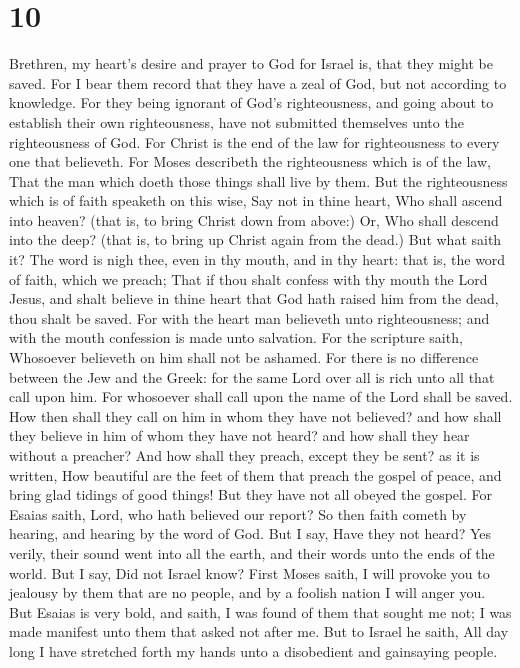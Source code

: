 \hypertarget{section-9}{%
\section{10}\label{section-9}}

 Brethren, my heart's desire and prayer to God for Israel
is, that they might be saved.  For I bear them record that
they have a zeal of God, but not according to knowledge. 
For they being ignorant of God's righteousness, and going about to
establish their own righteousness, have not submitted themselves unto
the righteousness of God.  For Christ is the end of the law
for righteousness to every one that believeth.  For Moses
describeth the righteousness which is of the law, That the man which
doeth those things shall live by them.  But the
righteousness which is of faith speaketh on this wise, Say not in thine
heart, Who shall ascend into heaven? (that is, to bring Christ down from
above:)  Or, Who shall descend into the deep? (that is, to
bring up Christ again from the dead.)  But what saith it?
The word is nigh thee, even in thy mouth, and in thy heart: that is, the
word of faith, which we preach;  That if thou shalt confess
with thy mouth the Lord Jesus, and shalt believe in thine heart that God
hath raised him from the dead, thou shalt be saved.  For
with the heart man believeth unto righteousness; and with the mouth
confession is made unto salvation.  For the scripture
saith, Whosoever believeth on him shall not be ashamed. 
For there is no difference between the Jew and the Greek: for the same
Lord over all is rich unto all that call upon him.  For
whosoever shall call upon the name of the Lord shall be saved.
 How then shall they call on him in whom they have not
believed? and how shall they believe in him of whom they have not heard?
and how shall they hear without a preacher?  And how shall
they preach, except they be sent? as it is written, How beautiful are
the feet of them that preach the gospel of peace, and bring glad tidings
of good things!  But they have not all obeyed the gospel.
For Esaias saith, Lord, who hath believed our report?  So
then faith cometh by hearing, and hearing by the word of God.
 But I say, Have they not heard? Yes verily, their sound
went into all the earth, and their words unto the ends of the world.
 But I say, Did not Israel know? First Moses saith, I will
provoke you to jealousy by them that are no people, and by a foolish
nation I will anger you.  But Esaias is very bold, and
saith, I was found of them that sought me not; I was made manifest unto
them that asked not after me.  But to Israel he saith, All
day long I have stretched forth my hands unto a disobedient and
gainsaying people.

